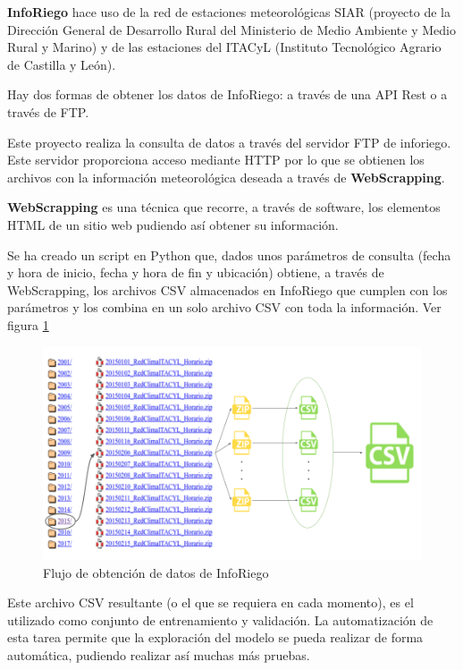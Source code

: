 \textbf{InfoRiego} hace uso de la red de estaciones meteorológicas SIAR (proyecto de la Dirección General de Desarrollo Rural del Ministerio de Medio Ambiente y Medio Rural y Marino) y de las estaciones del ITACyL (Instituto Tecnológico Agrario de Castilla y León).

Hay dos formas de obtener los datos de InfoRiego: a través de una API Rest o a través de FTP.

Este proyecto realiza la consulta de datos a través del servidor FTP de inforiego. Este servidor proporciona acceso mediante HTTP por lo que se obtienen los archivos con la información meteorológica deseada a través de \textbf{WebScrapping}.

\textbf{WebScrapping} es una técnica que recorre, a través de software, los elementos HTML de un sitio web pudiendo así obtener su información.

Se ha creado un script en Python que, dados unos parámetros de consulta (fecha y hora de inicio, fecha y hora de fin y ubicación) obtiene, a través de WebScrapping, los archivos CSV almacenados en InfoRiego que cumplen con los parámetros y los combina en un solo archivo CSV con toda la información. Ver figura \ref{inforiego}

\begin{figure}[htb]
	\begin{center}
		\includegraphics[width=15cm]{figures/inforiego.png}
		\caption{Flujo de obtención de datos de InfoRiego}
	\end{center}
	\label{inforiego}
\end{figure}

Este archivo CSV resultante (o el que se requiera en cada momento), es el utilizado como conjunto de entrenamiento y validación. La automatización de esta tarea permite que la exploración del modelo se pueda realizar de forma automática, pudiendo realizar así muchas más pruebas.

